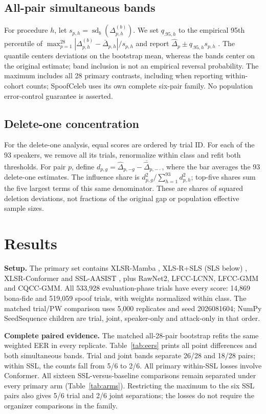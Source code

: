 \documentclass{article}
\begin{document}
\subsection{All-pair simultaneous bands}
\label{sec:family}
For procedure $h$, let $s_{p,h}=\operatorname{sd}_b(\Delta_{p,h}^{(b)})$. We set $q_{.95,h}$ to the empirical 95th percentile of $\max_{p=1}^{28}|\Delta_{p,h}^{(b)}-\bar\Delta_{p,h}|/s_{p,h}$ and report $\hat\Delta_p\pm q_{.95,h}s_{p,h}$ \cite{montiel19}. The quantile centers deviations on the bootstrap mean, whereas the bands center on the original estimate; band inclusion is not an empirical reversal probability. The maximum includes all 28 primary contrasts, including when reporting within-cohort counts; SpoofCeleb uses its own complete six-pair family. No population error-control guarantee is asserted.


\subsection{Delete-one concentration}
For the delete-one analysis, equal scores are ordered by trial ID. For each of the 93 speakers, we remove all its trials, renormalize within class and refit both thresholds. For pair $p$, define $d_{p,g}=\hat\Delta_{p,-g}-\overline{\hat\Delta}_{p,-\cdot}$, where the bar averages the 93 delete-one estimates. The influence share is $d_{p,g}^2/\sum_{h=1}^{93}d_{p,h}^2$; top-five shares sum the five largest terms of this same denominator. These are shares of squared deletion deviations, not fractions of the original gap or population effective sample sizes.

\section{Results}
\label{sec:exp}
\textbf{Setup.} The primary set contains XLSR-Mamba \cite{xiao25}, XLS-R+SLS (SLS below) \cite{zhang24sls}, XLSR-Conformer \cite{rosello23} and SSL-AASIST \cite{tak22}, plus RawNet2, LFCC-LCNN, LFCC-GMM and CQCC-GMM. All 533,928 evaluation-phase trials have every score: 14,869 bona-fide and 519,059 spoof trials, with weights normalized within class. The matched trial/PW comparison uses 5,000 replicates and seed 2026081604; NumPy SeedSequence children are trial, joint, speaker-only and attack-only in that order.

\textbf{Complete paired evidence.} The matched all-28-pair bootstrap refits the same weighted EER in every replicate. Table~\ref{tab:eers} prints all point differences and both simultaneous bands. Trial and joint bands separate 26/28 and 18/28 pairs; within SSL, the counts fall from 5/6 to 2/6. All primary within-SSL losses involve Conformer. All sixteen SSL-versus-baseline comparisons remain separated under every primary arm (Table~\ref{tab:arms}). Restricting the maximum to the six SSL pairs also gives 5/6 trial and 2/6 joint separations; the losses do not require the organizer comparisons in the family.
\end{document}
